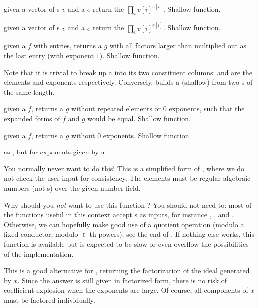  given a vector of s
$v$ and a  $e$ return the  $\prod_i v[i]^{e[i]}$. Shallow
function.

 given a vector of s
$v$ and a  $e$ return the  $\prod_i v[i]^{e[i]}$. Shallow
function.

 given a  $f$ with
 entries, returns a  $g$ with all factors larger than
 multiplied out as the last entry (with exponent $1$). Shallow
function.

Note that it is trivial to break up a  into its two constituent
columns:  and  are the elements and exponents
respectively. Conversely,  builds a (shallow)  from
two s of the same length.

 given a  $f$, returns a 
$g$ without repeated elements or 0 exponents, such that the expanded forms
of $f$ and $g$ would be equal. Shallow function.

 given a  $f$, returns a
 $g$ without 0 exponents. Shallow function.

 as , but for exponents
given by a .

 You normally never want to do this!
This is a simplified form of , where we do not check the
user input for consistency. The elements must be regular algebraic numbers
(not s) over the given number field.

Why should you \emph{not} want to use this function ? You should not need to:
most of the functions useful in this context accept s as inputs,
for instance , ,  and
. Otherwise, we can hopefully make good use of a quotient
operation (modulo a fixed conductor, modulo $\ell$-th powers); see the end of
. If nothing else works, this function is
available but is expected to be slow or even overflow the possibilities of
the implementation.

 This is a good alternative for
, returning the factorization of the ideal generated by
$x$. Since the answer is still given in factorized form, there is no risk of
coefficient explosion when the exponents are large. Of course, all components
of $x$ must be factored individually.

